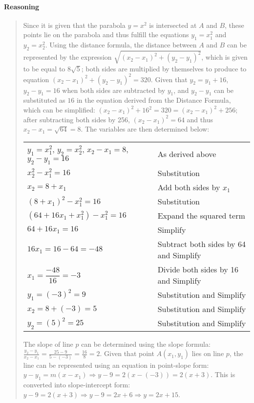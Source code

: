 \documentclass[letterpaper,12pt,twoside]{report}
\begin{document}
	\paragraph{Reasoning}
	\begin{quotation}
		
		Since it is given that the parabola $y=x^2$ is intersected at $A$ and $B$, these points lie on the parabola and thus fulfill the equations $y_1=x_1^2$ and $y_2=x_2^2$. Using the distance formula, the distance between $A$ and $B$ can be represented by the expression $\sqrt{(x_2-x_1)^2+(y_2-y_1)^2}$, which is given to be equal to $8\sqrt{5}$; both sides are multiplied by themselves to produce to equation $(x_2-x_1)^2+(y_2-y_1)^2=320$. Given that $y_2=y_1+16$, $y_2-y_1=16$ when both sides are subtracted by $y_1$, and $y_2-y_1$ can be substituted as $16$ in the equation derived from the Distance Formula, which can be simplified: $(x_2-x_1)^2+16^2=320=(x_2-x_1)^2+256$; after subtracting both sides by 256, $(x_2-x_1)^2=64$ and thus $x_2-x_1=\sqrt{64}=8$. The variables are then determined below:
		\begin{center}
			\begin{tabular}{l | l}
				$y_1=x_1^2$, $y_2=x_2^2$, $x_2-x_1=8$, $y_2-y_1=16$ & As derived above \\
				$x_2^2-x_1^2=16$ & Substitution \\
				$x_2=8+x_1$ & Add both sides by $x_1$ \\
				$(8+x_1)^2-x_1^2=16$ & Substitution \\
				$(64+16x_1+x_1^2)-x_1^2=16$ & Expand the squared term \\
				$64+16x_1=16$ & Simplify \\
				$16x_1=16-64=-48$ & Subtract both sides by 64 and Simplify \\
				$x_1=\dfrac{-48}{16}=-3$ & Divide both sides by 16 and Simplify \\
				$y_1=(-3)^2=9$ & Substitution and Simplify \\
				$x_2=8+(-3)=5$ & Substitution and Simplify \\
				$y_2=(5)^2=25$ & Substitution and Simplify
			\end{tabular}
		\end{center}
	
		The slope of line $p$ can be determined using the slope formula: $\frac{y_2-y_1}{x_2-x_1}=\frac{25-9}{5-(-3)}=\frac{16}{8}=2$. Given that point $A(x_1,y_1)$ lies on line $p$, the line can be represented using an equation in point-slope form: $y-y_1=m(x-x_1) \Rightarrow y-9=2(x-(-3))=2(x+3)$. This is converted into slope-intercept form: $y-9=2(x+3) \Rightarrow y-9=2x+6 \Rightarrow \boxed{y=2x+15}$.
	\end{quotation}
	
\end{document}
